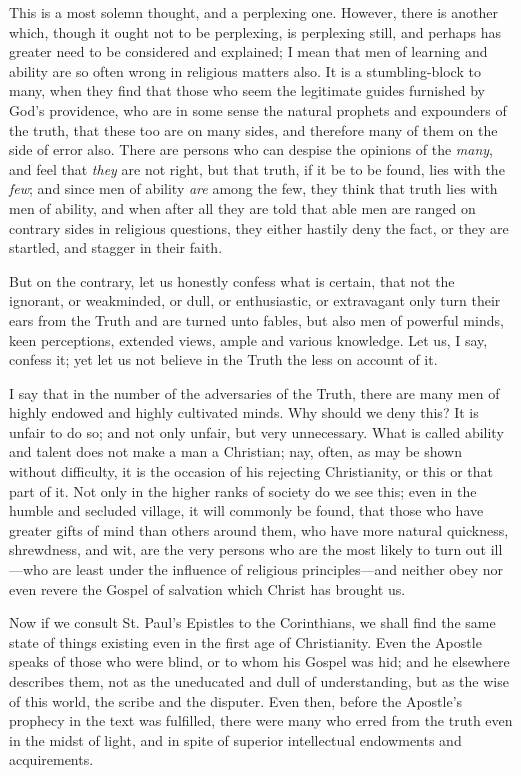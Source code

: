 This is a most solemn thought, and a perplexing one. However, there
is another which, though it ought not to be perplexing, is perplexing
still, and perhaps has greater need to be considered and explained; I
mean that men of learning and ability are so often wrong in religious
matters also. It is a stumbling-block to many, when they find that
those who seem the legitimate guides furnished by God's providence,
who are in some sense the natural prophets and expounders of the
truth, that these too are on many sides, and therefore many of them on
the side of error also. There are persons who can despise the opinions
of the \emph{many}, and feel that \emph{they} are not right, but that
truth, if it be to be found, lies with the \emph{few}; and since men
of ability \emph{are} among the few, they think that truth lies with
men of ability, and when after all they are told that able men are
ranged on contrary sides in religious questions, they either hastily
deny the fact, or they are startled, and stagger in their faith.

But on the contrary, let us honestly confess what is certain, that
not the ignorant, or weakminded, or dull, or enthusiastic, or
extravagant only turn their ears from the Truth and are turned unto
fables, but also men of powerful minds, keen perceptions, extended
views, ample and various knowledge. Let us, I say, confess it; yet let
us not believe in the Truth the less on account of it.

I say that in the number of the adversaries of the Truth, there are
many men of highly endowed and highly cultivated minds. Why should we
deny this? It is unfair to do so; and not only unfair, but very
unnecessary. What is called ability and talent does not make a man a
Christian; nay, often, as may be shown without difficulty, it is the
occasion of his rejecting Christianity, or this or that part of it.
Not only in the higher ranks of society do we see this; even in the
humble and secluded village, it will commonly be found, that those who
have greater gifts of mind than others around them, who have more
natural quickness, shrewdness, and wit, are the very persons who are
the most likely to turn out ill—who are least under the influence of
religious principles—and neither obey nor even revere the Gospel of
salvation which Christ has brought us.

Now if we consult St. Paul's Epistles to the Corinthians, we shall
find the same state of things existing even in the first age of
Christianity. Even the Apostle speaks of those who were blind, or to
whom his Gospel was hid; and he elsewhere describes them, not as the
uneducated and dull of understanding, but as the wise of this world,
the scribe and the disputer. Even then, before the Apostle's prophecy
in the text was fulfilled, there were many who erred from the truth
even in the midst of light, and in spite of superior intellectual
endowments and acquirements.

